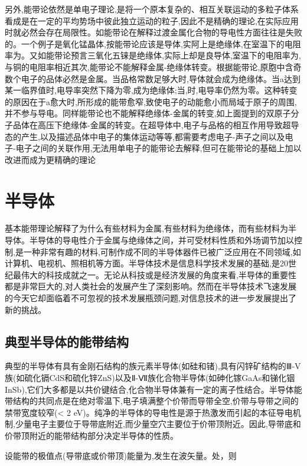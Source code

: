 另外,能带论依然是单电子理论,是将一个原本复杂的、相互关联运动的多粒子体系看成是在一定的平均势场中彼此独立运动的粒子,因此不是精确的理论,在实际应用时就必然会存在局限性。如能带论在解释过渡金属化合物的导电性方面往往是失败的。一个例子是氧化锰晶体,按能带论应该是导体,实阿上是绝缘体,在室温下的电阻率为。又如能带论预言三氧化五铼是绝缘体,实际上却是良导体,室温下的电阻率为,与铜的电阻率相近其次,能带论不能解释金属-绝缘体转变。根据能带论,原胞中含奇数个电子的品体必然是金属。当品格常数足够大时,导体就会成为绝缘体。当a达到某一临界值时,电导率突然下降为零,成为绝缘体;当,时,电导率仍然为零。这种转变的原因在于a愈大时,所形成的能带愈窄,致使电子的动能愈小而局域于原子的周围,并不参与导电。同样能带论也不能解释绝缘体-金属的转变,如上面提到的双原子分子品体在高压下绝缘体-金属的转变。在超导体中,电子与品格的相互作用导致超导态的产生,以及描述品体中电子的集体运动等等,都需要考虑电子-声子之间以及电子-电子之间的关联作用,无法用单电子的能带论去解释,但可在能带论的基础上加以改进而成为更精确的理论



\section{半导体}

基本能带理论解释了为什么有些材料为金属,有些材料为绝缘体，而有些材料为半导体。半导体的导电性介于金属与绝缘体之间，并可受材料性质和外场调节加以控制,是一种非常有趣的材料,可制作成不同的半导体器件已被广泛应用在不同领域,如计算机、电视机、照相机等方面。半导体技术是信息科学技术发展的基础,是20世纪最伟大的科技成就之一。无论从科技或是经济发展的角度来看,半导体的重要性都是非常巨大的,对人类社会的发展产生了深刻影响。然而在半导体技术飞速发展的今天它却面临着不可忽视的技术发展瓶颈问题,对信息技术的进一步发展提出了新的挑战。

\subsection{典型半导体的能带结构}

典型的半导体有具有金刚石结构的族元素半导体(如硅和锗),具有闪锌矿结构的Ⅲ-V族(如硫化镉CdS和硫化锌ZnS)以及Ⅱ-Ⅶ族化合物半导体(如砷化镓GaAs和锑化铟InSb),它们大多都是以共价键结合,化合物半导体兼有一定的离子性结合。半导体能带结构的共同点是在绝对零温下,电子填满整个价带而导带全空,价带与导带之间的禁带宽度较窄(< 2 eV)。纯净的半导体的导电性是源于热激发而引起的本征导电机制,少量电子主要位于导带底附近,而少量空穴主要位于价带顶附近。因此,导带底和价带顶附近的能带结构部分决定半导体的性质。

设能带的极值点(导带底或价带顶)能量为,发生在波矢量。处，则

